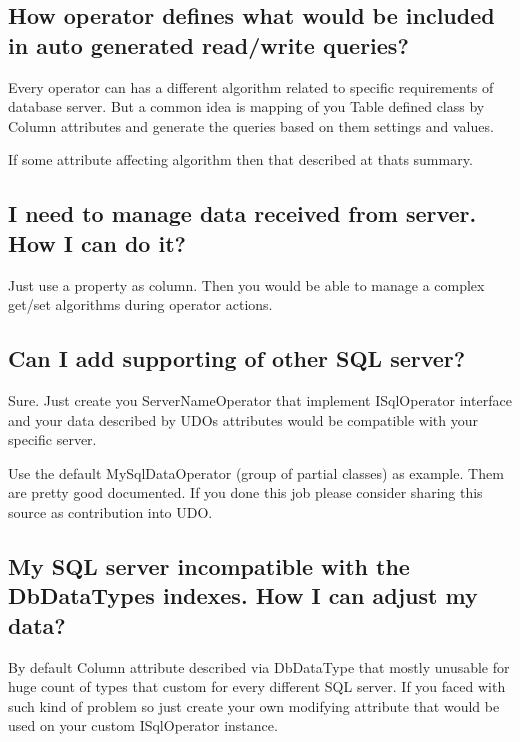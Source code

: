 \subsection*{How operator defines what would be included in auto generated read/write queries?}

Every operator can has a different algorithm related to specific requirements of database server. But a common idea is mapping of you \textquotesingle{}Table\textquotesingle{} defined class by {\ttfamily Column} attributes and generate the queries based on them settings and values.

If some attribute affecting algorithm then that described at that\textquotesingle{}s summary.

\subsection*{I need to manage data received from server. How I can do it?}

Just use a property as column. Then you would be able to manage a complex get/set algorithms during operator actions.

\subsection*{Can I add supporting of other S\+QL server?}

Sure. Just create you Server\+Name\+Operator that implement I\+Sql\+Operator interface and your data described by U\+DO\textquotesingle{}s attributes would be compatible with your specific server.

Use the default My\+Sql\+Data\+Operator (group of partial classes) as example. Them are pretty good documented. If you done this job please consider sharing this source as contribution into U\+DO.

\subsection*{My S\+QL server incompatible with the Db\+Data\+Type\textquotesingle{}s indexes. How I can adjust my data?}

By default {\ttfamily Column} attribute described via {\ttfamily Db\+Data\+Type} that mostly unusable for huge count of types that custom for every different S\+QL server. If you faced with such kind of problem so just create your own modifying attribute that would be used on your custom {\ttfamily I\+Sql\+Operator} instance.


